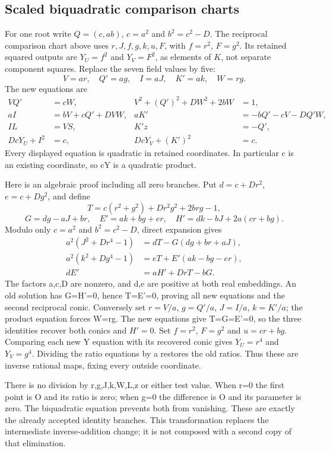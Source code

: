 \subsection{Scaled biquadratic comparison charts}
For one root write $Q=(c,ab)$, $c=a^2$ and $b^2=c^2-D$.
The reciprocal comparison chart above uses $r,J,f,g,k,u,F$, with
$f=r^2$, $F=g^2$. Its retained squared outputs are
$Y_U=f^2$ and $Y_V=F^2$, as elements of $K$, not separate component
squares. Replace the seven field values by five:
\[
 V=ar,\quad Q'=ag,\quad I=aJ,\quad K'=ak,\quad W=rg.
\]
The new equations are
\begin{align*}
 VQ'&=cW,& V^2+(Q')^2+DW^2+2bW&=1,\\
 aI&=bV+cQ'+DVW,& aK'&=-bQ'-cV-DQ'W,\\
 IL&=VS,& K'z&=-Q',\\
 DcY_U+I^2&=c,& DcY_V+(K')^2&=c.
\end{align*}
Every displayed equation is quadratic in retained coordinates. In
particular c is an existing coordinate, so cY is a quadratic product.

Here is an algebraic proof including all zero branches. Put
$d=c+Dr^2$, $e=c+Dg^2$, and define
\[
 T=c(r^2+g^2)+Dr^2g^2+2brg-1,
\]
\[
 G=dg-aJ+br,\quad E'=ak+bg+er,\quad
 H'=dk-bJ+2a(cr+bg).
\]
Modulo only $c=a^2$ and $b^2=c^2-D$, direct expansion gives
\begin{align*}
 a^2(J^2+Dr^4-1)&=dT-G(dg+br+aJ),\\
 a^2(k^2+Dg^4-1)&=eT+E'(ak-bg-er),\\
 dE'&=aH'+DrT-bG.
\end{align*}
The factors a,c,D are nonzero, and d,e are positive at both real
embeddings. An old solution has G=H'=0, hence T=E'=0, proving
all new equations and the second reciprocal conic. Conversely set
$r=V/a$, $g=Q'/a$, $J=I/a$, $k=K'/a$; the product equation
forces W=rg. The new equations give T=G=E'=0, so the three
identities recover both conics and $H'=0$. Set $f=r^2$, $F=g^2$ and
$u=cr+bg$. Comparing each new Y equation with its recovered conic
gives $Y_U=r^4$ and $Y_V=g^4$. Dividing the ratio equations by a
restores the old ratios. Thus these are inverse rational maps,
fixing every outside coordinate.

There is no division by r,g,J,k,W,L,z or either test value. When
r=0 the first point is O and its ratio is zero; when g=0 the
difference is O and its parameter is zero. The biquadratic equation
prevents both from vanishing. These are exactly the already accepted
identity branches. This transformation replaces the intermediate inverse-addition change;
it is not composed with a second copy of that elimination.

